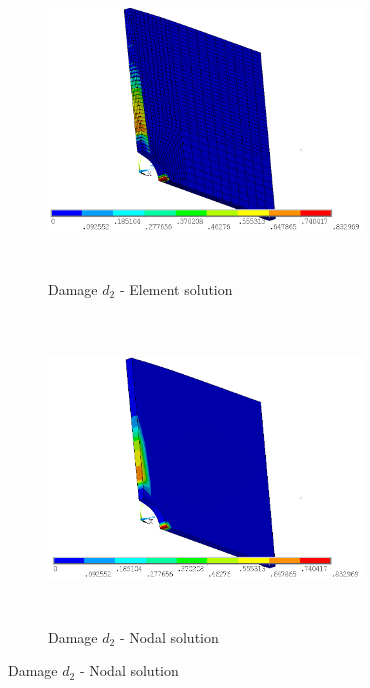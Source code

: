\documentclass[a4paper,12pt,twoside]{report}
\begin{document}
\begin{figure}[htbp!]\ContinuedFloat     
     \begin{subfigure}[b]{0.4\textwidth}
        \includegraphics[width=8.3cm,height=8.2cm,keepaspectratio]{27.d2-lt-e.png}
         \caption{Damage $d_{2}$ - Element solution}
         \label{fig:d2-lt-e}
     \end{subfigure}
    \hspace{1.8cm}
      \begin{subfigure}[b]{0.4\textwidth}
         \includegraphics[width=8.3cm,height=8.2cm,keepaspectratio]{27.d2-lt-n.png}
         \caption{Damage $d_{2}$ - Nodal solution}
         \label{fig:d2-lt-n}
     \end{subfigure}
\end{figure}
\FloatBarrier
\end{document}
